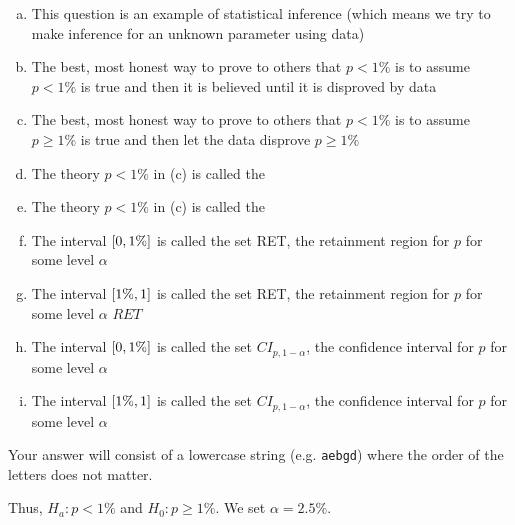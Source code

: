 \documentclass[12pt,landscape]{article}
\newcommand{\instr}{\small Your answer will consist of a lowercase string (e.g. \texttt{aebgd}) where the order of the letters does not matter. \normalsize}
\begin{document}
\vspace{-0.2cm}\benum{} 
\begin{enumerate}[(a)]

\item This question is an example of statistical inference (which means we try to make inference for an unknown parameter using data)
\item The best, most honest way to prove to others that $p < 1\%$ is to assume $p < 1\%$ is true and then it is believed until it is disproved by data
\item The best, most honest way to prove to others that $p < 1\%$ is to assume $p \geq 1\%$ is true and then let the data disprove $p \geq 1\%$
\item The theory $p < 1\%$ in (c) is called the 
\item The theory $p < 1\%$ in (c) is called the 

\item The interval $\left[0, 1\%\right]$ is called the set RET, the retainment region for $p$ for some level $\alpha$
\item The interval $\left[1\%, 1\right]$ is called the set RET, the retainment region for $p$ for some level $\alpha$ $RET$
\item The interval $\left[0, 1\%\right]$ is called the set $CI_{p, 1-\alpha}$, the confidence interval for $p$ for some level $\alpha$
\item The interval $\left[1\%, 1\right]$ is called the set $CI_{p, 1-\alpha}$, the confidence interval for $p$ for some level $\alpha$
\end{enumerate}
\eenum\instr\pagebreak


\problem{}  Thus, $H_a: p < 1\%$ and $H_0: p \geq 1\%$. We set $\alpha = 2.5\%$.
\end{document}

